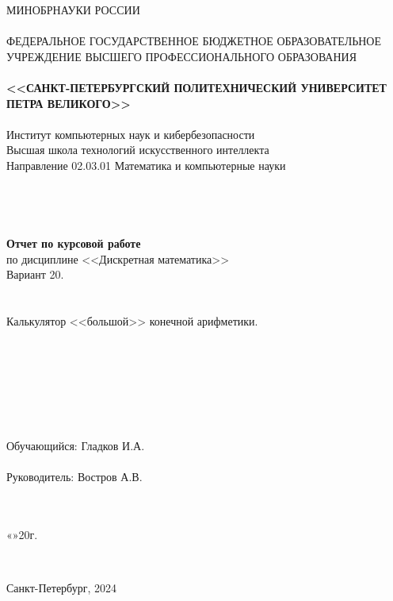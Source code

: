 \documentclass[10pt,a4paper,final]{article} %
\begin{document}
	\thispagestyle{empty}
	
	\begin{center}
		{\Large МИНОБРНАУКИ РОССИИ}\\
		~\\
		{\large ФЕДЕРАЛЬНОЕ ГОСУДАРСТВЕННОЕ БЮДЖЕТНОЕ ОБРАЗОВАТЕЛЬНОЕ УЧРЕЖДЕНИЕ ВЫСШЕГО ПРОФЕССИОНАЛЬНОГО ОБРАЗОВАНИЯ}\\
		~\\
		{\Large \bf <<САНКТ-ПЕТЕРБУРГСКИЙ ПОЛИТЕХНИЧЕСКИЙ УНИВЕРСИТЕТ ПЕТРА ВЕЛИКОГО>>}\\
		~\\
		{\large Институт компьютерных наук и кибербезопасности}\\
		{\large Высшая школа технологий искусственного интеллекта}\\
		{\large Направление 02.03.01 Математика и компьютерные науки}\\
		~\\
		~\\
		~\\
		~\\
		{\Large \bf Отчет по курсовой работе}\\
			{\Large по дисциплине <<Дискретная математика>> }\\
				{\Large Вариант 20.}\\
		~\\
		~\\
		{\Large  Калькулятор <<большой>> конечной арифметики.}\\
		~\\
		~\\
		~\\
		~\\
		~\\
		~\\
		~\\
		{\large Обучающийся: \underline{\hspace{3.5cm}} \qquad\qquad Гладков И.А.}\\
		~\\
		{\large Руководитель: \underline{\hspace{3.5cm}} \hspace{14mm} Востров А.В.}\\
		~\\
		~\\
	\end{center}
	\begin{flushright}
		
		«\underline{\hspace{1cm}}»\underline{\hspace{3cm}}20\underline{\hspace{0.7cm}}г.
	\end{flushright}
	~\\
	\begin{center}
		{\large Санкт-Петербург, 2024}
	\end{center}
	\newpage
	
\end{document}
